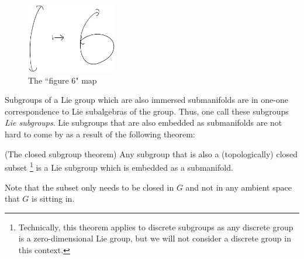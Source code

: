 \begin{figure}[H]\label{fig:6}
	\begin{center}
		\includegraphics[width=0.35\textwidth]{img/figure-6-map.png}
		\caption{The ``figure 6" map}
	\end{center}
\end{figure}
\noindent 
Subgroups of a Lie group which are also immersed submanifolds are in one-one correspondence to Lie subalgebras of the group. Thus, one call these subgroups \emph{Lie subgroups}. Lie subgroups that are also embedded as submanifolds are not hard to come by as a result of the following theorem:
\begin{theorem}\label{thm:closed-subgroup} {\normalfont (The closed subgroup theorem) %
\cite[Theorem 20.12 p. 523]{Lee}}
	Any subgroup that is also a (topologically) closed subset \footnote{Technically, this theorem applies to discrete subgroups as any discrete group is a zero-dimensional Lie group, but we will not consider a discrete group in this context.} is a Lie subgroup which is embedded as a submanifold.
\end{theorem}
\noindent Note that the subset only needs to be closed in $G$ and not in any ambient space that $G$ is sitting in.

